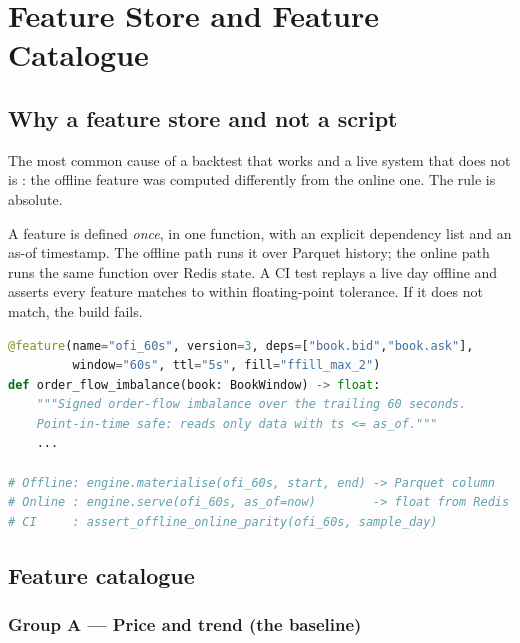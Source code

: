 \chapter{Feature Store and Feature Catalogue}
\label{ch:features}

\section{Why a feature store and not a script}

The most common cause of a backtest that works and a live system that does not
is : the offline feature was computed differently from
the online one. The rule is absolute.

\begin{keybox}[title={One definition, two materialisations}]
A feature is defined \emph{once}, in one function, with an explicit dependency
list and an as-of timestamp. The offline path runs it over Parquet history; the
online path runs the same function over Redis state. A CI test replays a live
day offline and asserts every feature matches to within floating-point
tolerance. If it does not match, the build fails.
\end{keybox}

\begin{lstlisting}[language=Python,caption={Feature definition pattern}]
@feature(name="ofi_60s", version=3, deps=["book.bid","book.ask"],
         window="60s", ttl="5s", fill="ffill_max_2")
def order_flow_imbalance(book: BookWindow) -> float:
    """Signed order-flow imbalance over the trailing 60 seconds.
    Point-in-time safe: reads only data with ts <= as_of."""
    ...

# Offline: engine.materialise(ofi_60s, start, end) -> Parquet column
# Online : engine.serve(ofi_60s, as_of=now)        -> float from Redis
# CI     : assert_offline_online_parity(ofi_60s, sample_day)
\end{lstlisting}

\section{Feature catalogue}

\subsection{Group A --- Price and trend (the baseline)}

